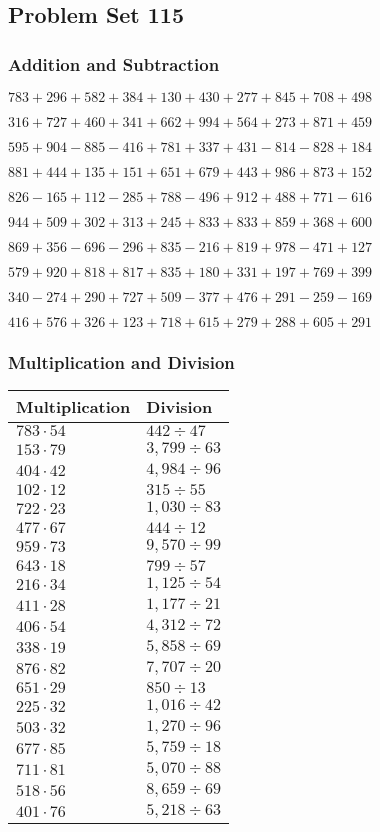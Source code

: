\hypertarget{problem-set-115}{%
\subsection{Problem Set 115}\label{problem-set-115}}

\hypertarget{addition-and-subtraction}{%
\subsubsection{Addition and
Subtraction}\label{addition-and-subtraction}}

\(783 +296 +582 +384 +130 +430 +277 +845 +708 +498\)

\(316 +727 +460 +341 +662 +994 +564 +273 +871 +459\)

\(595 +904 - 885 - 416 +781 +337 +431 - 814 - 828 +184\)

\(881 +444 +135 +151 +651 +679 +443 +986 +873 +152\)

\(826 - 165 +112 - 285 +788 - 496 +912 +488 +771 - 616\)

\(944 +509 +302 +313 +245 +833 +833 +859 +368 +600\)

\(869 +356 - 696 - 296 +835 - 216 +819 +978 - 471 +127\)

\(579 +920 +818 +817 +835 +180 +331 +197 +769 +399\)

\(340 - 274 +290 +727 +509 - 377 +476 +291 - 259 - 169\)

\(416 +576 +326 +123 +718 +615 +279 +288 +605 +291\)

\hypertarget{multiplication-and-division}{%
\subsubsection{Multiplication and
Division}\label{multiplication-and-division}}

\begin{longtable}[]{@{}ll@{}}
\toprule
Multiplication & Division\tabularnewline
\midrule
\endhead
\(783 \cdot 54\) & \(442÷47\)\tabularnewline
\(153 \cdot 79\) & \(3,799÷63\)\tabularnewline
\(404 \cdot 42\) & \(4,984÷96\)\tabularnewline
\(102 \cdot 12\) & \(315÷55\)\tabularnewline
\(722 \cdot 23\) & \(1,030÷83\)\tabularnewline
\(477 \cdot 67\) & \(444÷12\)\tabularnewline
\(959 \cdot 73\) & \(9,570÷99\)\tabularnewline
\(643 \cdot 18\) & \(799÷57\)\tabularnewline
\(216 \cdot 34\) & \(1,125÷54\)\tabularnewline
\(411 \cdot 28\) & \(1,177÷21\)\tabularnewline
\(406 \cdot 54\) & \(4,312÷72\)\tabularnewline
\(338 \cdot 19\) & \(5,858÷69\)\tabularnewline
\(876 \cdot 82\) & \(7,707÷20\)\tabularnewline
\(651 \cdot 29\) & \(850÷13\)\tabularnewline
\(225 \cdot 32\) & \(1,016÷42\)\tabularnewline
\(503 \cdot 32\) & \(1,270÷96\)\tabularnewline
\(677 \cdot 85\) & \(5,759÷18\)\tabularnewline
\(711 \cdot 81\) & \(5,070÷88\)\tabularnewline
\(518 \cdot 56\) & \(8,659÷69\)\tabularnewline
\(401 \cdot 76\) & \(5,218÷63\)\tabularnewline
\bottomrule
\end{longtable}
